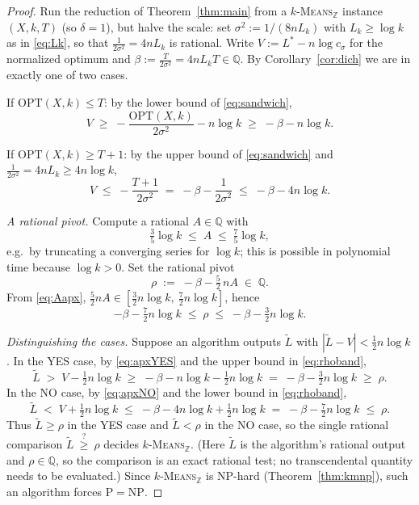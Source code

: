 \documentclass{amsart}
\theoremstyle{plain}
\theoremstyle{definition}
\newcommand{\Z}{\mathbb{Z}}
\newcommand{\Q}{\mathbb{Q}}
\begin{document}
\begin{proof}
Run the reduction of Theorem~\ref{thm:main} from a \textsc{$k$-Means$_{\Z}$}
instance $(X,k,T)$ (so $\delta=1$), but halve the scale: set
$\sigma^{2}:=1/(8nL_{k})$ with $L_{k}\ge\log k$ as in \eqref{eq:Lk}, so that
$\tfrac{1}{2\sigma^{2}}=4nL_{k}$ is rational. Write $V:=L^{\ast}-n\log c_{\sigma}$
for the normalized optimum and $\beta:=\tfrac{T}{2\sigma^{2}}=4nL_kT\in\Q$. By
Corollary~\ref{cor:dich} we are in exactly one of two cases.

If $\mathrm{OPT}(X,k)\le T$: by the lower bound of \eqref{eq:sandwich},
\begin{equation}\label{eq:apxYES}
V\;\ge\;-\frac{\mathrm{OPT}(X,k)}{2\sigma^{2}}-n\log k\;\ge\;-\beta-n\log k.
\end{equation}

If $\mathrm{OPT}(X,k)\ge T+1$: by the upper bound of \eqref{eq:sandwich} and
$\tfrac{1}{2\sigma^{2}}=4nL_{k}\ge 4n\log k$,
\begin{equation}\label{eq:apxNO}
V\;\le\;-\frac{T+1}{2\sigma^{2}}\;=\;-\beta-\frac{1}{2\sigma^{2}}
\;\le\;-\beta-4n\log k.
\end{equation}

\emph{A rational pivot.} Compute a rational $A\in\Q$ with
\begin{equation}\label{eq:Aapx}
\tfrac{3}{5}\log k\;\le\;A\;\le\;\tfrac{7}{5}\log k ,
\end{equation}
e.g.\ by truncating a converging series for $\log k$; this is possible in
polynomial time because $\log k>0$. Set the rational pivot
\[
\rho\;:=\;-\beta-\tfrac{5}{2}\,nA\;\in\;\Q .
\]
From \eqref{eq:Aapx}, $\tfrac{5}{2}nA\in[\tfrac{3}{2}n\log k,\ \tfrac{7}{2}n\log k]$,
hence
\begin{equation}\label{eq:rhoband}
-\beta-\tfrac{7}{2}n\log k\;\le\;\rho\;\le\;-\beta-\tfrac{3}{2}n\log k .
\end{equation}

\emph{Distinguishing the cases.} Suppose an algorithm outputs $\widetilde L$ with
$|\widetilde L-V|<\tfrac12 n\log k$. In the YES case, by \eqref{eq:apxYES} and the
upper bound in \eqref{eq:rhoband},
\[
\widetilde L\;>\;V-\tfrac12 n\log k\;\ge\;-\beta-n\log k-\tfrac12 n\log k
\;=\;-\beta-\tfrac32 n\log k\;\ge\;\rho .
\]
In the NO case, by \eqref{eq:apxNO} and the lower bound in \eqref{eq:rhoband},
\[
\widetilde L\;<\;V+\tfrac12 n\log k\;\le\;-\beta-4n\log k+\tfrac12 n\log k
\;=\;-\beta-\tfrac72 n\log k\;\le\;\rho .
\]
Thus $\widetilde L\ge\rho$ in the YES case and $\widetilde L<\rho$ in the NO case,
so the single rational comparison $\widetilde L\ \overset{?}{\ge}\ \rho$ decides
\textsc{$k$-Means$_{\Z}$}. (Here $\widetilde L$ is the algorithm's rational output
and $\rho\in\Q$, so the comparison is an exact rational test; no transcendental
quantity needs to be evaluated.) Since \textsc{$k$-Means$_{\Z}$} is NP-hard
(Theorem~\ref{thm:kmnp}), such an algorithm forces $\mathrm{P}=\mathrm{NP}$.
\end{proof}
\end{document}
